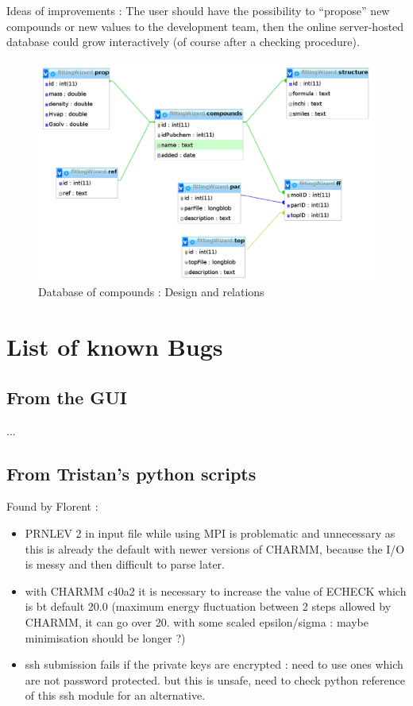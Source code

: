 \documentclass[12pt,a4paper]{article}
\begin{document}
Ideas of improvements :
The user should have the possibility to ``propose'' new compounds or new values to the 
development team, then the online server-hosted database could grow interactively (of course after 
a checking procedure).

\begin{figure}[h!]
\centering
\includegraphics[width=0.9\linewidth]{pics/db}
\caption{Database of compounds : Design and relations}
\label{dbFig}
\end{figure}


\section{List of known Bugs}

\subsection{From the GUI}

...

\subsection{From Tristan's python scripts}

Found by Florent :
\begin{itemize}
\item PRNLEV 2 in input file while using MPI is problematic and unnecessary as this is already the 
default with newer versions of CHARMM, because the I/O is messy and then difficult to parse later.
\item with CHARMM c40a2 it is necessary to increase the value of ECHECK which is bt default 20.0 
(maximum energy fluctuation between 2 steps allowed by CHARMM, it can go over 20. with some scaled 
epsilon/sigma : maybe minimisation should be longer ?)
\item ssh submission fails if the private keys are encrypted : need to use ones which are not 
password protected. but this is unsafe, need to check python reference of this ssh module for an 
alternative. 
\end{itemize}
\end{document}
